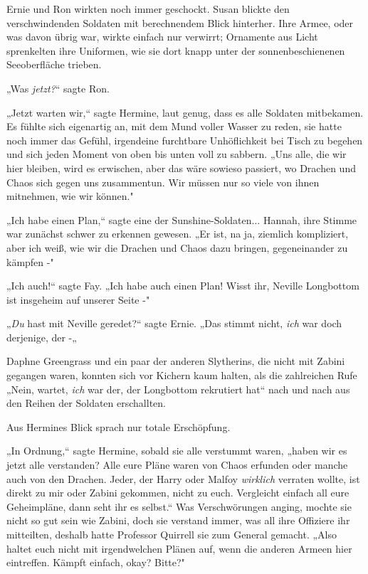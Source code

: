 {Ernie und Ron wirkten noch immer geschockt. Susan blickte den verschwindenden Soldaten mit berechnendem Blick hinterher. Ihre Armee, oder was davon übrig war, wirkte einfach nur verwirrt; Ornamente aus Licht sprenkelten ihre Uniformen, wie sie dort knapp unter der sonnenbeschienenen Seeoberfläche trieben.

„Was \emph{jetzt?}“ sagte Ron.

„Jetzt warten wir,“ sagte Hermine, laut genug, dass es alle Soldaten mitbekamen. Es fühlte sich eigenartig an, mit dem Mund voller Wasser zu reden, sie hatte noch immer das Gefühl, irgendeine furchtbare Unhöflichkeit bei Tisch zu begehen und sich jeden Moment von oben bis unten voll zu sabbern. „Uns alle, die wir hier bleiben, wird es erwischen, aber das wäre sowieso passiert, wo Drachen und Chaos sich gegen uns zusammentun. Wir müssen nur so viele von ihnen mitnehmen, wie wir können."

„Ich habe einen Plan,“ sagte eine der Sunshine-Soldaten... Hannah, ihre Stimme war zunächst schwer zu erkennen gewesen. „Er ist, na ja, ziemlich kompliziert, aber ich weiß, wie wir die Drachen und Chaos dazu bringen, gegeneinander zu kämpfen -"

„Ich auch!“ sagte Fay. „Ich habe auch einen Plan! Wisst ihr, Neville Longbottom ist insgeheim auf unserer Seite -"

„\emph{Du} hast mit Neville geredet?“ sagte Ernie. „Das stimmt nicht, \emph{ich} war doch derjenige, der -„

Daphne Greengrass und ein paar der anderen Slytherins, die nicht mit Zabini gegangen waren, konnten sich vor Kichern kaum halten, als die zahlreichen Rufe „Nein, wartet, \emph{ich} war der, der Longbottom rekrutiert hat“ nach und nach aus den Reihen der Soldaten erschallten.

Aus Hermines Blick sprach nur totale Erschöpfung.

„In Ordnung,“ sagte Hermine, sobald sie alle verstummt waren, „haben wir es jetzt alle verstanden? Alle eure Pläne waren von Chaos erfunden oder manche auch von den Drachen. Jeder, der Harry oder Malfoy \emph{wirklich} verraten wollte, ist direkt zu mir oder Zabini gekommen, nicht zu euch. Vergleicht einfach all eure Geheimpläne, dann seht ihr es selbst.“ Was Verschwörungen anging, mochte sie nicht so gut sein wie Zabini, doch sie verstand immer, was all ihre Offiziere ihr mitteilten, deshalb hatte Professor Quirrell sie zum General gemacht. „Also haltet euch nicht mit irgendwelchen Plänen auf, wenn die anderen Armeen hier eintreffen. Kämpft einfach, okay? Bitte?"

}

